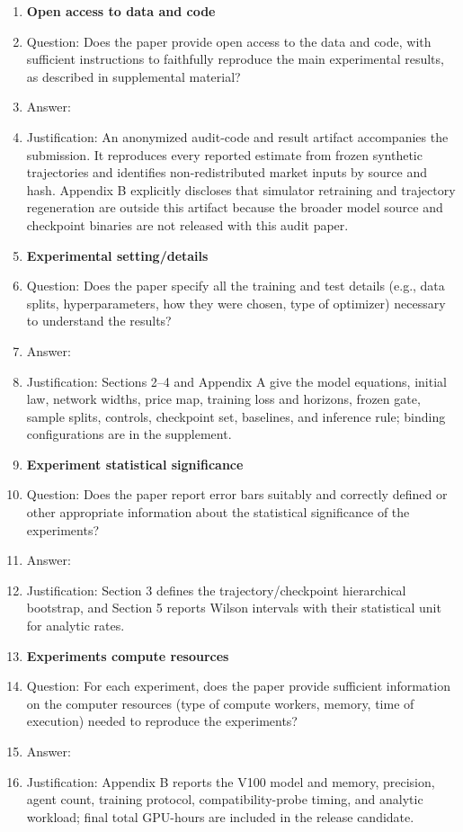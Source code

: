 \begin{enumerate}
\item {\bf Open access to data and code}
    \item[] Question: Does the paper provide open access to the data and code, with sufficient instructions to faithfully reproduce the main experimental results, as described in supplemental material?
    \item[] Answer: \answerYes{}
    \item[] Justification: An anonymized audit-code and result artifact accompanies the submission. It reproduces every reported estimate from frozen synthetic trajectories and identifies non-redistributed market inputs by source and hash. Appendix B explicitly discloses that simulator retraining and trajectory regeneration are outside this artifact because the broader model source and checkpoint binaries are not released with this audit paper.

\item {\bf Experimental setting/details}
    \item[] Question: Does the paper specify all the training and test details (e.g., data splits, hyperparameters, how they were chosen, type of optimizer) necessary to understand the results?
    \item[] Answer: \answerYes{}
    \item[] Justification: Sections 2--4 and Appendix A give the model equations, initial law, network widths, price map, training loss and horizons, frozen gate, sample splits, controls, checkpoint set, baselines, and inference rule; binding configurations are in the supplement.

\item {\bf Experiment statistical significance}
    \item[] Question: Does the paper report error bars suitably and correctly defined or other appropriate information about the statistical significance of the experiments?
    \item[] Answer: \answerYes{}
    \item[] Justification: Section 3 defines the trajectory/checkpoint hierarchical bootstrap, and Section 5 reports Wilson intervals with their statistical unit for analytic rates.

\item {\bf Experiments compute resources}
    \item[] Question: For each experiment, does the paper provide sufficient information on the computer resources (type of compute workers, memory, time of execution) needed to reproduce the experiments?
    \item[] Answer: \answerYes{}
    \item[] Justification: Appendix B reports the V100 model and memory, precision, agent count, training protocol, compatibility-probe timing, and analytic workload; final total GPU-hours are included in the release candidate.


\end{enumerate}
